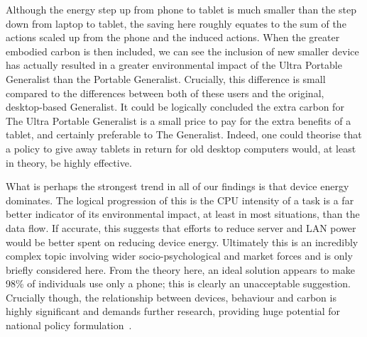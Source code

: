 \documentclass[conference]{IEEEtran}
\begin{document}


Although the energy step up from phone to tablet is much smaller than
the step down from laptop to tablet, the saving here roughly equates
to the sum of the actions scaled up from the phone and the induced
actions. When the greater embodied carbon is then included, we can see
the inclusion of new smaller device has actually resulted in a greater
environmental impact of the Ultra Portable Generalist than the
Portable Generalist. Crucially, this difference is small compared to
the differences between both of these users and the original,
desktop-based Generalist. It could be logically concluded the extra
carbon for The Ultra Portable Generalist is a small price to pay for
the extra benefits of a tablet, and certainly preferable to The
Generalist. Indeed, one could theorise that a policy to give away
tablets in return for old desktop computers would, at least in theory,
be highly effective.


What is perhaps the strongest trend in all of our findings is that
device energy dominates. The logical progression of this is the CPU
intensity of a task is a far better indicator of its environmental
impact, at least in most situations, than the data flow. If accurate,
this suggests that efforts to reduce server and LAN power would be
better spent on reducing device energy. Ultimately this is an
incredibly complex topic involving wider socio-psychological and
market forces and is only briefly considered here. From the theory
here, an ideal solution appears to make 98\% of individuals use only a
phone; this is clearly an unacceptable suggestion. Crucially though,
the relationship between devices, behaviour and carbon is highly
significant and demands further research, providing huge potential for
national policy formulation~\cite{smart2020:2008,ruth:2011}.
\end{document}
